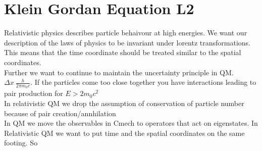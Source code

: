 \documentclass{article}
\begin{document}
\section{Klein Gordan Equation L2}
Relativistic physics describes particle behaivour at high energies. We want our description of the laws of physics to be invariant under lorentz transformations. This means that the time coordinate should be treated similar to the spatial coordinates. \\
Further we want to continue to maintain the uncertainty principle in QM. \(\Delta x ~ \frac{h}{2\pi m_0c}\). If the particles come too close together you have interactions leading to pair production for \(E > 2m_0c^2\) \\
In relativistic QM we drop the assumption of conservation of particle number because of pair creation/annhilation \\

In QM we move the observables in Cmech to operators that act on eigenstates. In Relativistic QM we want to put time and the spatial coordinates on the same footing. So 
\end{document}
